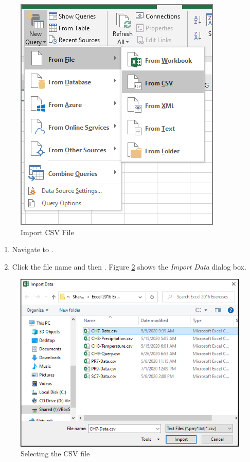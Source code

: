 \begin{figure}[H]
	\centering
	\includegraphics[width=\maxwidth{.65\linewidth}]{gfx/ch07_fig05a}
	\caption{Import CSV File}
	\label{07:fig05a}
\end{figure}

\begin{enumerate}[resume]
	\item Navigate to .
	\item Click the file name and then . Figure \ref{07:fig06} shows the \textit{Import Data} dialog box.
\end{enumerate}

\begin{figure}[H]
	\centering
	\includegraphics[width=\maxwidth{.95\linewidth}]{gfx/ch07_fig06}
	\caption{Selecting the CSV file}
	\label{07:fig06}
\end{figure}

